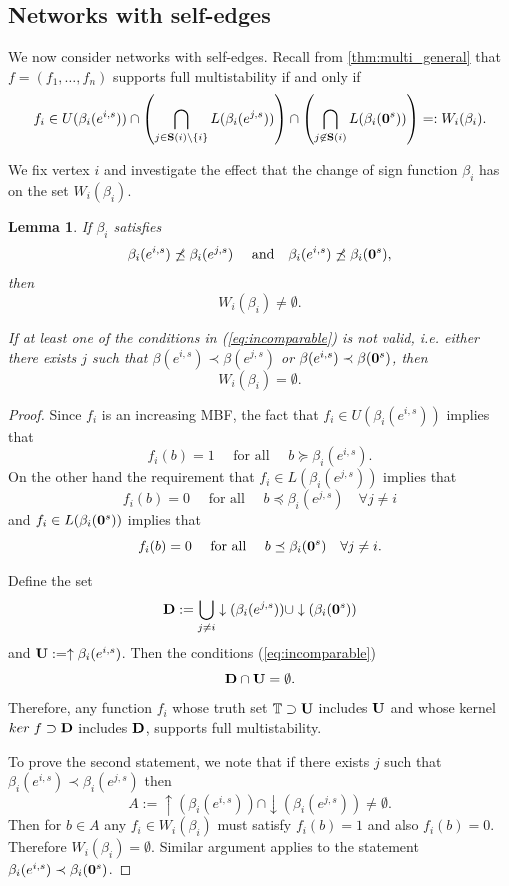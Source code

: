\documentclass[12pt]{amsart}
\newcommand{\bD}{{\bf D}}
\newcommand{\bU}{{\bf U}}
\newcommand{\bzero}{{\bf 0}}
\newcommand{\bbT}{\mathbb{T}}
\newcommand{\Sources}{\mathbf{S}}
\newtheorem{lem}[thm]{Lemma}
\theoremstyle{definition}
\begin{document}
\subsection{Networks with self-edges}
We now consider networks with self-edges. Recall from \cref{thm:multi_general} that 
$f=(f_1, \ldots, f_n)$ supports full multistability if and only if 
\begin{equation} \label{eq:W}
f_i \in U(\beta_i(e^{i,s}))\cap \left( \bigcap_{j \in \Sources(i)\setminus \{i\}} L(\beta_i(e^{j,s})) \right)\cap \left(\bigcap_{j\not \in \Sources(i)} L(\beta_i(\bzero^s))\right) =: W_i(\beta_i).
\end{equation}

We fix vertex $i$ and investigate the effect that the change of sign function $\beta_i$ has on the set $W_i(\beta_i)$.

\begin{lem} \label{lem:self}
 If $\beta_i$ satisfies 
 \begin{equation}\label{eq:incomparable}
 \beta_i(e^{i,s})\not \preceq \beta_i(e^{j,s}) \quad \mbox{ and} \quad \beta_i(e^{i,s}) \not \preceq \beta_i(\bzero^s), 
 \end{equation}
 then 
 \[ W_i(\beta_i) \not = \emptyset.\]

If at least one of the conditions in (\ref{eq:incomparable}) is not valid, i.e. either there exists $j$ such that $\beta(e^{i,s})\prec \beta(e^{j,s}) $ or $\beta(e^{i,s})\prec \beta(\bzero^s) $,
then 
\[ W_i(\beta_i) = \emptyset.\]
 
\end{lem}
\begin{proof}
Since $f_i$ is an increasing MBF, the fact that $f_i\in U(\beta_i(e^{i,s}))$ implies that 
\[ f_i(b) = 1 \quad \mbox{ for all }\quad  b\succeq \beta_i(e^{i,s}).\]
On the other hand the requirement that $f_i\in L(\beta_i(e^{j,s}))$ implies that 
\[ f_i(b) = 0 \quad \mbox{ for all }\quad  b\preceq \beta_i(e^{j,s}) \quad\forall j\not = i\] and 
$f_i\in L(\beta_i(\bzero^s))$ implies that
\[ f_i(b) = 0 \quad \mbox{ for all }\quad  b\preceq \beta_i(\bzero^s) \quad\forall j\not = i.\] 

Define the set 
\[ \bD:= \bigcup_{j\not = i} \downarrow (\beta_i(e^{j,s})) \cup \downarrow (\beta_i(\bzero^s))\]
and $\bU:=\uparrow \beta_i(e^{i,s})$. 
Then the conditions (\ref{eq:incomparable})
\[ \bD \cap \bU = \emptyset.\]
Therefore, any function $f_i$ whose truth set $\bbT \supset \bU$ includes $\bU$ and whose kernel $ker \; f \supset \bD $ includes $\bD$, supports full multistability.

To prove the second statement, we note that if there exists $j$ such that $\beta_i(e^{i,s})\prec \beta_i(e^{j,s}) $ then 
\[ A:=\uparrow  (\beta_i(e^{i,s})) \cap \downarrow (\beta_i(e^{j,s})) \not = \emptyset.\]
Then for $b\in A$ any $f_i \in W_i(\beta_i)$ must satisfy $f_i(b) = 1$ and also $f_i(b) = 0$. Therefore $W_i(\beta_i) = \emptyset$.
Similar argument applies to the statement $\beta_i(e^{i,s})\prec \beta_i(\bzero^s)$.
\end{proof}
\end{document}
